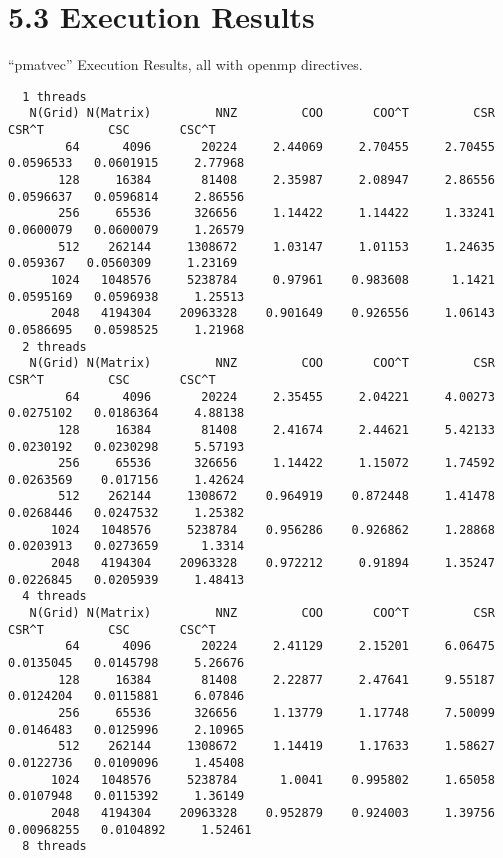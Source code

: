 \documentclass[]{article}
\begin{document}
\section*{5.3 Execution Results}\label{5.3.1.appendix}
    ``pmatvec'' Execution Results, all with openmp directives. 
    \begin{lstlisting}
  1 threads   
   N(Grid) N(Matrix)         NNZ         COO       COO^T         CSR       CSR^T         CSC       CSC^T
        64      4096       20224     2.44069     2.70455     2.70455   0.0596533   0.0601915     2.77968
       128     16384       81408     2.35987     2.08947     2.86556   0.0596637   0.0596814     2.86556
       256     65536      326656     1.14422     1.14422     1.33241   0.0600079   0.0600079     1.26579
       512    262144     1308672     1.03147     1.01153     1.24635    0.059367   0.0560309     1.23169
      1024   1048576     5238784     0.97961    0.983608      1.1421   0.0595169   0.0596938     1.25513
      2048   4194304    20963328    0.901649    0.926556     1.06143   0.0586695   0.0598525     1.21968
  2 threads   
   N(Grid) N(Matrix)         NNZ         COO       COO^T         CSR       CSR^T         CSC       CSC^T
        64      4096       20224     2.35455     2.04221     4.00273   0.0275102   0.0186364     4.88138
       128     16384       81408     2.41674     2.44621     5.42133   0.0230192   0.0230298     5.57193
       256     65536      326656     1.14422     1.15072     1.74592   0.0263569    0.017156     1.42624
       512    262144     1308672    0.964919    0.872448     1.41478   0.0268446   0.0247532     1.25382
      1024   1048576     5238784    0.956286    0.926862     1.28868   0.0203913   0.0273659      1.3314
      2048   4194304    20963328    0.972212     0.91894     1.35247   0.0226845   0.0205939     1.48413
  4 threads   
   N(Grid) N(Matrix)         NNZ         COO       COO^T         CSR       CSR^T         CSC       CSC^T
        64      4096       20224     2.41129     2.15201     6.06475   0.0135045   0.0145798     5.26676
       128     16384       81408     2.22877     2.47641     9.55187   0.0124204   0.0115881     6.07846
       256     65536      326656     1.13779     1.17748     7.50099   0.0146483   0.0125996     2.10965
       512    262144     1308672     1.14419     1.17633     1.58627   0.0122736   0.0109096     1.45408
      1024   1048576     5238784      1.0041    0.995802     1.65058   0.0107948   0.0115392     1.36149
      2048   4194304    20963328    0.952879    0.924003     1.39756  0.00968255   0.0104892     1.52461
  8 threads   

\end{lstlisting}
\end{document}
